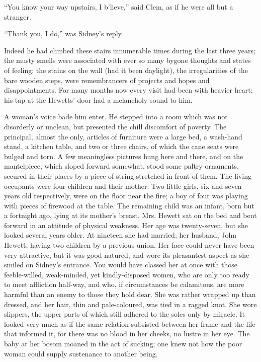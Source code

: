 ``You know your way upstairs, I b'lieve,'' said Clem, as if he were all
but a stranger.

``Thank you, I do,'' was Sidney's reply.

Indeed he had climbed these stairs innumerable times during the last
three years; the musty smells were associated with ever so many bygone
thoughts and states of feeling; the stains on the wall (had it been
daylight), the irregularities of the bare wooden steps, were
remembrancers of projects and hopes and disappointments. For many months
now every visit had been with heavier heart; his tap at the Hewetts'
door had a melancholy sound to him.

A woman's voice bade him enter. He stepped into a room which was not
disorderly or unclean, but presented the chill discomfort of poverty.
The principal, almost the only, articles of furniture were a large bed,
a {}wash-hand stand, a kitchen table, and two or three chairs, of which
the cane seats were bulged and torn. A few meaningless pictures hung
here and there, and on the mantelpiece, which sloped forward somewhat,
stood some paltry-ornaments, secured in their places by a piece of
string stretched in front of them. The living occupants were four
children and their mother. Two little girls, six and seven years old
respectively, were on the floor near the fire; a boy of four was playing
with pieces of firewood at the table. The remaining child was an infant,
born but a fortnight ago, lying at its mother's breast. Mrs. Hewett sat
on the bed and bent forward in an attitude of physical weakness. Her age
was twenty-seven, but she looked several years older. At nineteen she
had married; her husband, John Hewett, having two children by a previous
union. Her face could never have been very attractive, but it was
good-natured, and wore its pleasantest aspect as she smiled on Sidney's
entrance. You would have classed her at once with those {}feeble-willed,
weak-minded, yet kindly-disposed women, who are only too ready to meet
affliction half-way, and who, if circumstances be calamitous, are more
harmful than an enemy to those they hold dear. She was rather wrapped up
than dressed, and her hair, thin and pale-coloured, was tied in a ragged
knot. She wore slippers, the upper parts of which still adhered to the
soles only by miracle. It looked very much as if the same relation
subsisted between her frame and the life that informed it, for there was
no blood in her cheeks, no lustre in her eye. The baby at her bosom
moaned in the act of sucking; one knew not how the poor woman could
supply sustenance to another being.


